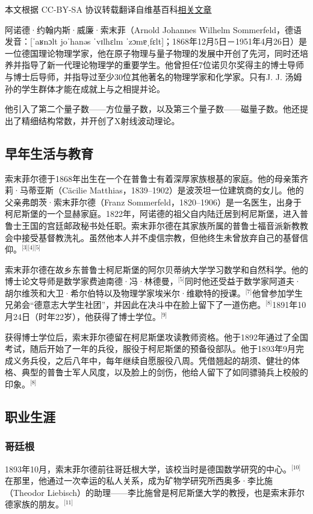 
本文根据 CC-BY-SA 协议转载翻译自维基百科\href{https://en.wikipedia.org/wiki/Arnold_Sommerfeld}{相关文章}

阿诺德·约翰内斯·威廉·索末菲（Arnold Johannes Wilhelm Sommerfeld，德语发音：[ˈaʁnɔlt joˈhanəs ˈvɪlhɛlm ˈzɔmɐˌfɛlt]；1868年12月5日－1951年4月26日）是一位德国理论物理学家，他在原子物理与量子物理的发展中开创了先河，同时还培养并指导了新一代理论物理学的重要学生。他曾担任7位诺贝尔奖得主的博士导师与博士后导师，并指导过至少30位其他著名的物理学家和化学家。只有J. J. 汤姆孙的学生群体才能在成就上与之相提并论。

他引入了第二个量子数——方位量子数，以及第三个量子数——磁量子数。他还提出了精细结构常数，并开创了X射线波动理论。
\subsection{早年生活与教育}
索末菲尔德于1868年出生在一个在普鲁士有着深厚家族根基的家庭。他的母亲策齐莉·马蒂亚斯（Cäcilie Matthias，1839–1902）是波茨坦一位建筑商的女儿。他的父亲弗朗茨·索末菲尔德（Franz Sommerfeld，1820–1906）是一名医生，出身于柯尼斯堡的一个显赫家庭。1822年，阿诺德的祖父自内陆迁居到柯尼斯堡，进入普鲁士王国的宫廷邮政秘书处任职。索末菲尔德在其家族所属的普鲁士福音派新教教会中接受基督教洗礼。虽然他本人并不虔信宗教，但他终生未曾放弃自己的基督信仰。\(^\text{[3][4][5]}\)

索末菲尔德在故乡东普鲁士柯尼斯堡的阿尔贝蒂纳大学学习数学和自然科学。他的博士论文导师是数学家费迪南德·冯·林德曼，\(^\text{[5]}\)同时他还受益于数学家阿道夫·胡尔维茨和大卫·希尔伯特以及物理学家埃米尔·维歇特的授课。\(^\text{[7]}\)他曾参加学生兄弟会“德意志大学生社团”，并因此在决斗中在脸上留下了一道伤疤。\(^\text{[8]}\)1891年10月24日（时年22岁），他获得了博士学位。\(^\text{[9]}\)

获得博士学位后，索末菲尔德留在柯尼斯堡攻读教师资格。他于1892年通过了全国考试，随后开始了一年的兵役，服役于柯尼斯堡的预备役部队。他于1893年9月完成义务兵役，之后八年中，每年继续自愿服役八周。凭借翘起的胡须、健壮的体格、典型的普鲁士军人风度，以及脸上的剑伤，他给人留下了如同骠骑兵上校般的印象。\(^\text{[8]}\)
\subsection{职业生涯}
\subsubsection{哥廷根}
1893年10月，索末菲尔德前往哥廷根大学，该校当时是德国数学研究的中心。\(^\text{[10]}\)在那里，他通过一次幸运的私人关系，成为矿物学研究所西奥多·李比施（Theodor Liebisch）的助理——李比施曾是柯尼斯堡大学的教授，也是索末菲尔德家族的朋友。\(^\text{[11]}\)


